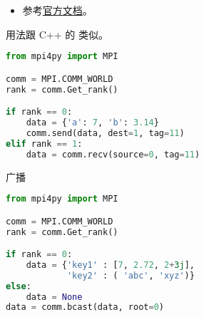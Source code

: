 
\begin{issues}
\issueDraft
\end{issues}

\begin{itemize}
\item 参考\href{https://mpi4py.readthedocs.io/en/stable/}{官方文档}。
\end{itemize}

用法跟 C++ 的  类似。

\begin{lstlisting}[language=python]
from mpi4py import MPI

comm = MPI.COMM_WORLD
rank = comm.Get_rank()

if rank == 0:
    data = {'a': 7, 'b': 3.14}
    comm.send(data, dest=1, tag=11)
elif rank == 1:
    data = comm.recv(source=0, tag=11)
\end{lstlisting}

广播
\begin{lstlisting}[language=python]
from mpi4py import MPI

comm = MPI.COMM_WORLD
rank = comm.Get_rank()

if rank == 0:
    data = {'key1' : [7, 2.72, 2+3j],
            'key2' : ( 'abc', 'xyz')}
else:
    data = None
data = comm.bcast(data, root=0)
\end{lstlisting}
